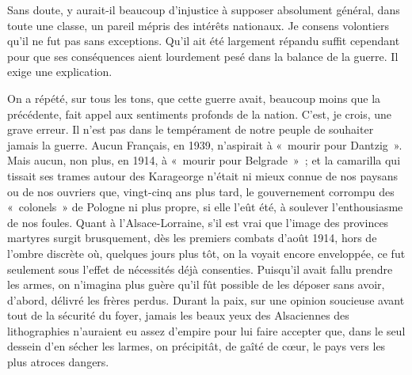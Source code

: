 \documentclass[french,twoside]{book} %
\begin{document}
Sans doute, y aurait-il beaucoup d’injustice à supposer absolument général, dans toute une classe, un pareil mépris des intérêts nationaux. Je consens volontiers qu’il ne fut pas sans exceptions. Qu’il ait été largement répandu suffit cependant pour que ses conséquences aient lourdement pesé dans la balance de la guerre. Il exige une explication.\par
On a répété, sur tous les tons, que cette guerre avait, beaucoup moins que la précédente, fait appel aux sentiments profonds de la nation. C’est, je crois, une grave erreur. Il n’est pas dans le tempérament de notre peuple de souhaiter jamais la guerre. Aucun Français, en 1939, n’aspirait à « mourir pour Dantzig ». Mais aucun, non plus, en 1914, à « mourir pour Belgrade » ; et la camarilla qui tissait ses trames autour des Karageorge n’était ni mieux connue de nos paysans ou de nos ouvriers que, vingt-cinq ans plus tard, le gouvernement corrompu des « colonels » de Pologne ni plus propre, si elle l’eût été, à soulever l’enthousiasme de nos foules. Quant à l’Alsace-Lorraine, s’il est vrai que l’image des provinces martyres surgit brusquement, dès les premiers combats d’août 1914, hors de l’ombre discrète où, quelques jours plus tôt, on la voyait encore enveloppée, ce fut seulement sous l’effet de nécessités déjà consenties. Puisqu’il avait fallu prendre les armes, on n’imagina plus guère qu’il fût possible de les déposer sans avoir, d’abord, délivré les frères perdus. Durant la paix, sur une opinion soucieuse avant tout de la sécurité du foyer, jamais les beaux yeux des Alsaciennes des lithographies n’auraient eu assez d’empire pour lui faire accepter que, dans le seul dessein d’en sécher les larmes, on précipitât, de gaîté de cœur, le pays vers les plus atroces dangers.\par
\end{document}
